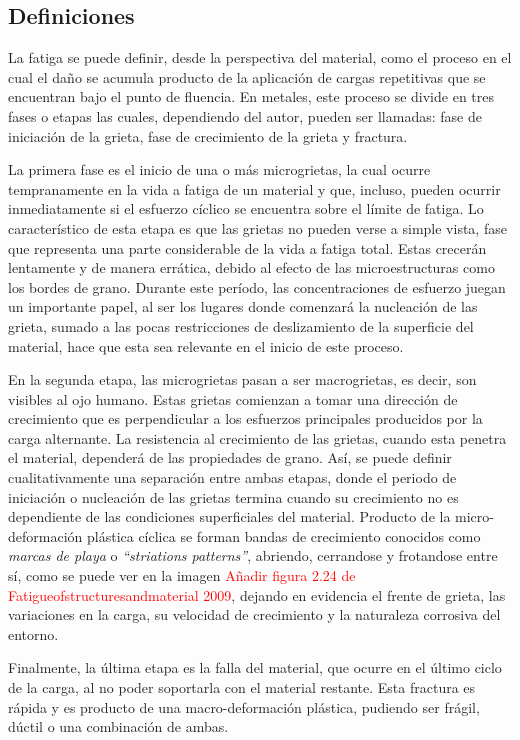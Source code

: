\subsection{Definiciones}
La fatiga se puede definir, desde la perspectiva del material, como el proceso en el cual el daño se acumula producto de la aplicación de cargas repetitivas que se encuentran bajo el punto de fluencia. En metales, este proceso se divide en tres fases o etapas las cuales, dependiendo del autor, pueden ser llamadas: fase de iniciación de la grieta, fase de crecimiento de la grieta y fractura.

La primera fase es el inicio de una o más microgrietas, la cual ocurre tempranamente en la vida a fatiga de un material y que, incluso, pueden ocurrir inmediatamente si el esfuerzo cíclico se encuentra sobre el límite de fatiga. Lo característico de esta etapa es que las grietas no pueden verse a simple vista, fase que representa una parte considerable de la vida a fatiga total. Estas crecerán lentamente y de manera errática, debido al efecto de las microestructuras como los bordes de grano. Durante este período, las concentraciones de esfuerzo juegan un importante papel, al ser los lugares donde comenzará la nucleación de las grieta, sumado a las pocas restricciones de deslizamiento de la superficie del material, hace que esta sea relevante en el inicio de este proceso.

En la segunda etapa, las microgrietas pasan a ser macrogrietas, es decir, son visibles al ojo humano. Estas grietas comienzan a tomar una dirección de crecimiento que es perpendicular a los esfuerzos principales producidos por la carga alternante. La resistencia al crecimiento de las grietas, cuando esta penetra el material, dependerá de las propiedades de grano. Así, se puede definir cualitativamente una separación entre ambas etapas, donde el periodo de iniciación o nucleación de las grietas termina cuando su crecimiento no es dependiente de las condiciones superficiales del material. Producto de la micro-deformación plástica cíclica se forman bandas de crecimiento conocidos como \textit{marcas de playa} o \textit{``striations patterns''}, abriendo, cerrandose y frotandose entre sí, como se puede ver en la imagen \textcolor{red}{Añadir figura 2.24 de Fatigueofstructuresandmaterial 2009}, dejando en evidencia el frente de grieta, las variaciones en la carga, su velocidad de crecimiento y la naturaleza corrosiva del entorno.

Finalmente, la última etapa es la falla del material, que ocurre en el último ciclo de la carga, al no poder soportarla con el material restante. Esta fractura es rápida y es producto de una macro-deformación plástica, pudiendo ser frágil, dúctil o una combinación de ambas.

